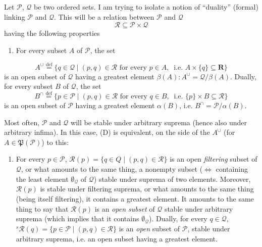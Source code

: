 Let $\mathcal{P}$, $\mathcal{Q}$ be two ordered sets. I am trying to isolate a notion of ``duality'' (formal) linking $\mathcal{P}$ and $\mathcal{Q}$. This will be a relation between $\mathcal{P}$ and $\mathcal{Q}$
\[
\mathcal{R} \subseteq \mathcal{P} \times \mathcal{Q}
\tag*{(5.1)}
\]
having the following properties
\begin{enumerate}[leftmargin=*, labelindent=0.5em]
\item[(D)] For every subset $A$ of $\mathcal{P}$, the set
\end{enumerate}
\[
A^\cup \overset{\text{def}}{=} \{ q \in \mathcal{Q} \mid (p,q) \in \mathcal{R} \text{ for every } p \in A,\ \text{ i.e. } A \times \{q\} \subseteq \mathbf{R} \} %
\]
is an open subset of $\mathcal{Q}$ having a greatest element $\beta(A) : A^\cup = \mathcal{Q}/\beta(A)$. Dually, for every subset $B$ of $\mathcal{Q}$, the set
\[
B^\cap \overset{\text{def}}{=} \{ p \in \mathcal{P} \mid (p,q) \in \mathcal{R} \text{ for every } q \in B,\ \text{ i.e. } \{p\} \times B \subseteq \mathcal{R} \}
\]
is an open subset of $\mathcal{P}$ having a greatest element $\alpha(B)$, i.e. $B^\cap = \mathcal{P}/\alpha(B)$.

Most often, $\mathcal{P}$ and $\mathcal{Q}$ will be stable under arbitrary suprema (hence also under arbitrary infima). In this case, (D) is equivalent, on the side of the $A^\cup$ (for $A \in \mathfrak{P}(\mathcal{P})$) to this:
\begin{enumerate}[leftmargin=*, labelindent=0em]
\item[(D$_0$)] For every $p \in \mathcal{P}$, $\mathcal{R}(p) = \{ q \in Q \mid (p,q) \in \mathcal{R} \}$ is an open \textit{filtering} subset of $\mathcal{Q}$, or what amounts to the same thing, a nonempty subset ($\Longleftrightarrow$ containing the least element $\emptyset_{\mathcal{Q}}$ of $\mathcal{Q}$) stable under suprema of two elements. Moreover, $\mathcal{R}(p)$ is stable under filtering suprema, or what amounts to the same thing (being itself filtering), it contains a greatest element. It amounts %
to the same thing to say that $\mathcal{R}(p)$ is an \textit{open subset} of $\mathcal{Q}$ stable under arbitrary suprema (which implies that it contains $\emptyset_{\mathcal{Q}}$). Dually, for every $q \in \mathcal{Q}$, ${}^{s}\mathcal{R}(q) = \{ p \in \mathcal{P} \mid (p,q) \in \mathcal{R} \}$ is an \textit{open} subset of $\mathcal{P}$, stable under arbitrary suprema, i.e. an open subset having a greatest element. %
\end{enumerate}

